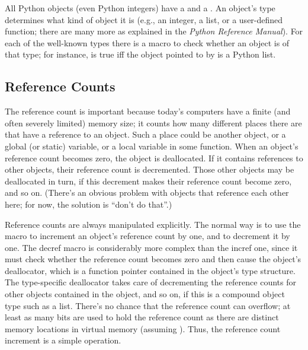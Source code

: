 \documentclass{manual}
\begin{document}
All Python objects (even Python integers) have a  and a
.  An object's type determines what kind of object 
it is (e.g., an integer, a list, or a user-defined function; there are 
many more as explained in the \emph{Python Reference Manual}).  For 
each of the well-known types there is a macro to check whether an 
object is of that type; for instance,  is
true iff the object pointed to by  is a Python list.


\subsection{Reference Counts \label{refcounts}}

The reference count is important because today's computers have a 
finite (and often severely limited) memory size; it counts how many 
different places there are that have a reference to an object.  Such a 
place could be another object, or a global (or static) \C{} variable, or 
a local variable in some \C{} function.  When an object's reference count 
becomes zero, the object is deallocated.  If it contains references to 
other objects, their reference count is decremented.  Those other 
objects may be deallocated in turn, if this decrement makes their 
reference count become zero, and so on.  (There's an obvious problem 
with objects that reference each other here; for now, the solution is 
``don't do that''.)

Reference counts are always manipulated explicitly.  The normal way is 
to use the macro  to increment an object's 
reference count by one, and  to decrement it by 
one.  The decref macro is considerably more complex than the incref one, 
since it must check whether the reference count becomes zero and then 
cause the object's deallocator, which is a function pointer contained 
in the object's type structure.  The type-specific deallocator takes 
care of decrementing the reference counts for other objects contained 
in the object, and so on, if this is a compound object type such as a 
list.  There's no chance that the reference count can overflow; at 
least as many bits are used to hold the reference count as there are 
distinct memory locations in virtual memory (assuming 
).  Thus, the reference count 
increment is a simple operation.
\end{document}

